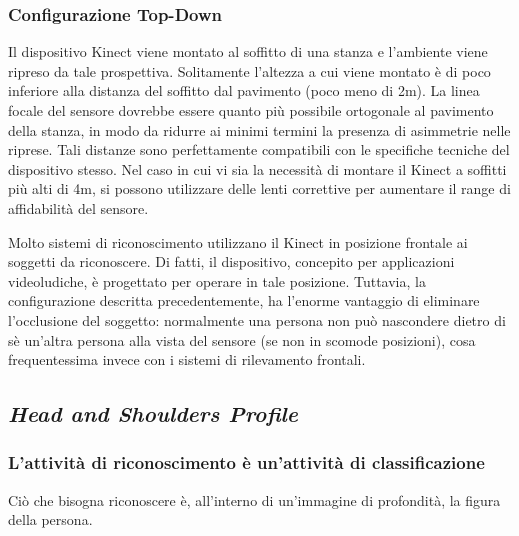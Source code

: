             \subsubsection{Configurazione Top-Down}
                Il dispositivo Kinect viene montato al soffitto di una stanza e l'ambiente viene ripreso da tale prospettiva.
                Solitamente l'altezza a cui viene montato è di poco inferiore alla distanza del soffitto dal pavimento (poco meno di 2m).
                La linea focale del sensore dovrebbe essere quanto più possibile ortogonale al pavimento della stanza, in modo da ridurre ai minimi termini la presenza di asimmetrie nelle riprese.
                Tali distanze sono perfettamente compatibili con le specifiche tecniche del dispositivo stesso.
                Nel caso in cui vi sia la necessità di montare il Kinect a soffitti più alti di 4m, si possono utilizzare delle lenti correttive per aumentare il range di affidabilità del sensore.

                Molto sistemi di riconoscimento utilizzano il Kinect in posizione frontale ai soggetti da riconoscere.
                Di fatti, il dispositivo, concepito per applicazioni videoludiche, è progettato per operare in tale posizione.
                Tuttavia, la configurazione descritta precedentemente, ha l'enorme vantaggio di eliminare l'occlusione del soggetto: normalmente una persona non può nascondere dietro di sè un'altra persona alla vista del sensore (se non in scomode posizioni), cosa frequentessima invece con i sistemi di rilevamento frontali.

        \subsection{\emph{Head and Shoulders Profile}}
        \label{sub:hasp}
            \subsubsection{L'attività di riconoscimento è un'attività di classificazione}
                Ciò che bisogna riconoscere è, all'interno di un'immagine di profondità, la figura della persona.

